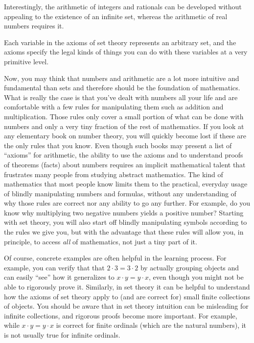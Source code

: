 Interestingly, the arithmetic of integers and
rationals can be developed without appealing to the
existence of an infinite set, whereas the arithmetic of real
numbers requires it.

Each variable in the axioms of set theory
represents an arbitrary set, and the axioms specify the legal kinds of things
you can do with these variables at a very primitive level.

Now, you may think that numbers and arithmetic are a lot more intuitive and
fundamental than sets and therefore should be the foundation of mathematics.
What is really the case is that you've dealt with numbers all your life and
are comfortable with a few rules for manipulating them such as addition and
multiplication.  Those rules only cover a small portion of what can be done
with numbers and only a very tiny fraction of the rest of mathematics.  If you
look at any elementary book on number theory, you will quickly become lost if
these are the only rules that you know.  Even though such books may present a
list of ``axioms'' for arithmetic, the ability to use the axioms
and to understand proofs of theorems (facts) about numbers
requires an implicit mathematical talent that frustrates many people
from studying abstract mathematics.  The kind of mathematics that most people
know limits them to the practical, everyday usage of blindly manipulating
numbers and formulas, without any understanding of why those rules are correct
nor any ability to go any further.  For example, do you know why multiplying
two negative numbers yields a positive number?  Starting with set theory, you
will also start off blindly manipulating symbols according to the rules we give
you, but with the advantage that these rules will allow you, in principle, to
access {\em all} of mathematics, not just a tiny part of it.

Of course, concrete examples are often helpful in the learning process. For
example, you can verify that that $2\cdot 3=3 \cdot 2$ by actually grouping
objects and can easily ``see'' how it generalizes to $x\cdot y = y\cdot x$,
even though you might not be able to rigorously prove it.  Similarly, in set
theory it can be helpful to understand how the axioms of set theory apply to
(and are correct for) small finite collections of objects.  You should be aware
that in set theory intuition can be misleading for infinite collections, and
rigorous proofs become more important.  For example, while $x\cdot y = y\cdot
x$ is correct for finite ordinals (which are the natural numbers), it is not
usually true for infinite ordinals.

